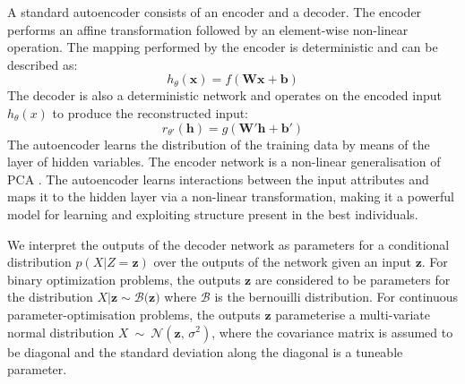 \documentclass[runningheads,a4paper]{llncs}
\begin{document}

A standard autoencoder consists of an encoder and a decoder. The encoder performs an affine transformation followed by an element-wise non-linear operation. The mapping performed by the encoder is deterministic and can be described as: $$h_{\theta}(\mathbf{x}) = f(\mathbf{Wx + b})$$ The decoder is also a deterministic network and operates on the encoded input $h_{\theta}(x)$ to produce the reconstructed input: $$ r_{\theta'}(\mathbf{h}) = g(\mathbf{W'h + b'})$$ The autoencoder learns the distribution of the training data by means of the layer of hidden variables. The encoder network is a non-linear generalisation of PCA \cite{hinton2006reducing}. The autoencoder learns interactions between the input attributes and maps it to the hidden layer via a non-linear transformation, making it a powerful model for learning and exploiting structure present in the best individuals.

We interpret the outputs of the decoder network as parameters for a conditional distribution $p(X|Z=\mathbf{z})$ over the outputs of the network given an input $\mathbf{z}$. For binary optimization problems, the outputs $\mathbf{z}$ are considered to be parameters for the distribution $X|\mathbf{z} \sim \mathcal{B(\mathbf{z}})$ where $\mathcal{B}$ is the bernouilli distribution. For continuous parameter-optimisation problems, the outputs $\mathbf z$ parameterise a multi-variate normal distribution $X\ \sim\ \mathcal{N}(\mathbf{z},\,\sigma^2)$, where the covariance matrix is assumed to be diagonal and the standard deviation along the diagonal is a tuneable parameter.
\end{document}

